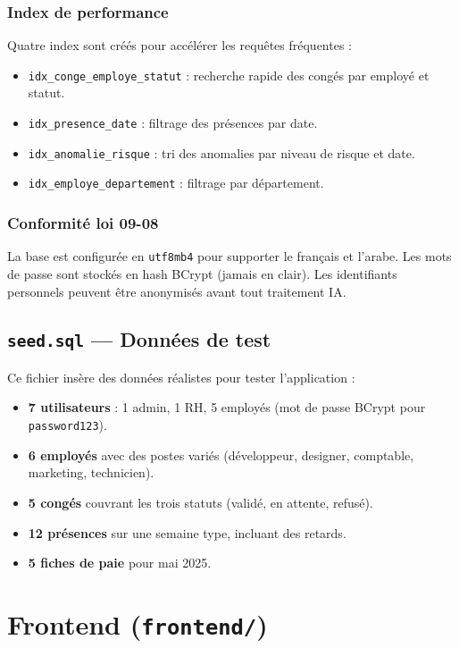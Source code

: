\documentclass[a4paper,12pt]{report}
\begin{document}
\subsection{Index de performance}
Quatre index sont créés pour accélérer les requêtes fréquentes :
\begin{itemize}
  \item \texttt{idx\_conge\_employe\_statut} : recherche rapide des congés par employé et statut.
  \item \texttt{idx\_presence\_date} : filtrage des présences par date.
  \item \texttt{idx\_anomalie\_risque} : tri des anomalies par niveau de risque et date.
  \item \texttt{idx\_employe\_departement} : filtrage par département.
\end{itemize}

\subsection{Conformité loi 09-08}
La base est configurée en \texttt{utf8mb4} pour supporter le français et l'arabe. Les mots de passe sont stockés en hash BCrypt (jamais en clair). Les identifiants personnels peuvent être anonymisés avant tout traitement IA.

\section{\texttt{seed.sql} --- Données de test}

Ce fichier insère des données réalistes pour tester l'application :
\begin{itemize}
  \item \textbf{7 utilisateurs} : 1 admin, 1 RH, 5 employés (mot de passe BCrypt pour \texttt{password123}).
  \item \textbf{6 employés} avec des postes variés (développeur, designer, comptable, marketing, technicien).
  \item \textbf{5 congés} couvrant les trois statuts (validé, en attente, refusé).
  \item \textbf{12 présences} sur une semaine type, incluant des retards.
  \item \textbf{5 fiches de paie} pour mai 2025.
\end{itemize}


\chapter{Frontend (\texttt{frontend/})}
\end{document}
